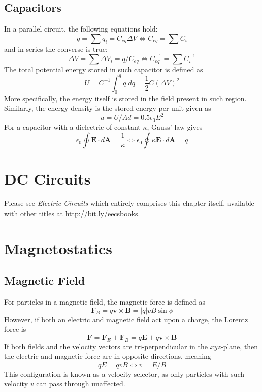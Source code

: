\documentclass[oneside,11pt]{book}
\renewcommand{\b}{\mathbf}
\begin{document}
\section{Capacitors}
In a parallel circuit, the following equations hold: \begin{equation}
    q = \sum q_i = C_{eq} \Delta V \iff C_{eq} = \sum C_i
\end{equation}
and in series the converse is true: \begin{equation}
    \Delta V = \sum \Delta V_i = q / C_{eq} \iff C_{eq}^{-1} = \sum C_i^{-1}
\end{equation}
The total potential energy stored in such capacitor is defined as \begin{equation}
    U = C^{-1} \int_0^q q \; dq = \textstyle{\frac{1}{2}} C (\Delta V)^2
\end{equation}
More specifically, the energy itself is stored in the field present in such region. Similarly, the energy density is the stored energy per unit given as \begin{equation}
    u = U/Ad = 0.5 \epsilon_0 E^2
\end{equation}
For a capacitor with a dielectric of constant $\kappa$, Gauss' law gives \begin{equation}
    \epsilon_0 \oint \b E \cdot d \b A = \frac{1}{\kappa} \iff \epsilon_0 \oint \kappa \b E \cdot d \b A = q
\end{equation}

\chapter{DC Circuits}
Please see \textit{Electric Circuits} which entirely comprises this chapter itself, available with other titles at \url{http://bit.ly/eecsbooks}.

\chapter{Magnetostatics}

\section{Magnetic Field}

For particles in a magnetic field, the magnetic force is defined as \begin{equation}
    \b F_B = q \b v \times \b B = |q|vB \sin \phi
\end{equation}
However, if both an electric and magnetic field act upon a charge, the Lorentz force is \begin{equation}
    \b F = \b F_E + \b F_B = q \b E + q \b v \times \b B
\end{equation}
If both fields and the velocity vectors are tri-perpendicular in the $xyz$-plane, then the electric and magnetic force are in opposite directions, meaning \begin{equation}
    qE = qvB \iff v = E/B
\end{equation}
This configuration is known as a velocity selector, as only particles with such velocity $v$ can pass through unaffected.
\end{document}
